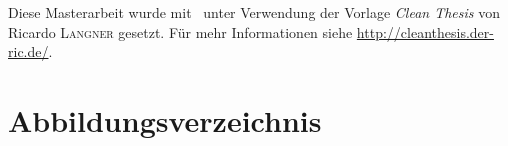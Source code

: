 
{%
\renewcommand{\bibfont}{\normalfont\small}
\setlength{\biblabelsep}{0pt}
\setlength{\bibitemsep}{0.5\baselineskip plus 0.5\baselineskip}
\printbibliography
}

\vfill

Diese Masterarbeit wurde mit \LaTeXe\ unter Verwendung der Vorlage \textit{Clean Thesis} von Ricardo \textsc{Langner} gesetzt.
Für mehr Informationen siehe \url{http://cleanthesis.der-ric.de/}.

\chapter*{Abbildungsverzeichnis}
\renewcommand\listfigurename{}
\vspace*{-2.35cm}
\listoffigures


\renewcommand\listalgorithmname{Algorithmenverzeichnis}
\listofalgorithms

\newpage
\renewcommand{\listoflistingscaption}{Listing-Verzeichnis}
\listoflistings

\cleardoublepage


